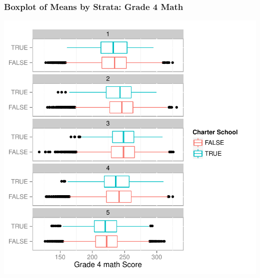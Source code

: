 \documentclass[10pt,handout,mathserif]{beamer}
\begin{document}
\begin{frame}[c]
	\frametitle{Boxplot of Means by Strata: Grade 4 Math}
	\begin{center}
	\includegraphics[height=0.86\textheight,keepaspectratio]{../Figures2009/g4math-strata5-boxplot}
	\end{center}
\end{frame}
\end{document}
